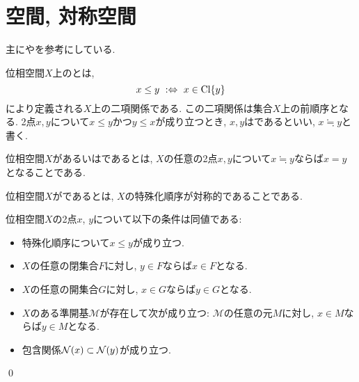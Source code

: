 \documentclass[uplatex, dvipdfmx, a4paper, 12pt, class=jsbook, crop=false]{standalone}
\begin{document}
\section{空間, 対称空間}
\label{sec:T0-spaces}

\newcommand{\topleq}{\leq}
\newcommand{\topindis}{\fallingdotseq}

\begin{source}
	主に\cite[Chapter 16]{Schechter1997HAF}や\cite[Section 4.2]{GoubaultLarrecq2013NH}を参考にしている.
\end{source}

\begin{definition}
	位相空間$ X $上のとは,
	\[ x \topleq y \defarw x \in \topcl \{y\} \]
	により定義される$ X $上の二項関係である.
	この二項関係は集合$X$上の前順序となる.
	2点$ x, y  $について$ x \leq y $かつ$ y \leq x $が成り立つとき,
	$ x, y $はであるといい,
	$ x \topindis y $と書く.
\end{definition}

\begin{definition}
	位相空間$ X $があるいはであるとは,
	$ X $の任意の2点$ x, y $について$ x \topindis y $ならば$ x = y $となることである.
\end{definition}

\begin{definition}
	位相空間$ X $がであるとは, $ X $の特殊化順序が対称的であることである.
\end{definition}

\begin{proposition}
	\newcommand{\cM}{\mathcal{M}}
	位相空間$X$の2点$x$, $y$について以下の条件は同値である:
	\begin{itemize}
		\item 特殊化順序について$x \leq y$が成り立つ.
		\item $X$の任意の閉集合$F$に対し, $y \in F$ならば$x \in F$となる.
		\item $X$の任意の開集合$G$に対し, $x \in G$ならば$y \in G$となる.
		\item $X$のある準開基$\cM$が存在して次が成り立つ: $\cM$の任意の元$M$に対し, $x \in M$ならば$y \in M$となる.
		\item 包含関係$\topnbd{x} \subset \topnbd{y}$が成り立つ.
	\end{itemize}
	\qed
\end{proposition}
\end{document}
